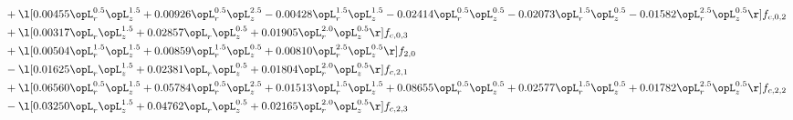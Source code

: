 \begin{alignat}{2}
& + \l[  0.00455 \opL_r^{0.5} \opL_z^{1.5} +  0.00926 \opL_r^{0.5} \opL_z^{2.5}   -0.00428 \opL_r^{1.5} \opL_z^{1.5}   -0.02414 \opL_r^{0.5} \opL_z^{0.5}   -0.02073 \opL_r^{1.5} \opL_z^{0.5}   -0.01582 \opL_r^{2.5} \opL_z^{0.5}  \r] f_{c,0,2} \nonumber \\ 
& + \l[  0.00317 \opL_r \opL_z^{1.5} +  0.02857 \opL_r \opL_z^{0.5} +  0.01905 \opL_r^{2.0} \opL_z^{0.5}  \r] f_{c,0,3} \nonumber \\ 
& + \l[  0.00504 \opL_r^{1.5} \opL_z^{1.5} +  0.00859 \opL_r^{1.5} \opL_z^{0.5} +  0.00810 \opL_r^{2.5} \opL_z^{0.5}  \r] f_{2,0} \nonumber \\ 
& - \l[  0.01625 \opL_r \opL_z^{1.5} +  0.02381 \opL_r \opL_z^{0.5} +  0.01804 \opL_r^{2.0} \opL_z^{0.5}  \r] f_{c,2,1} \nonumber \\ 
& + \l[  0.06560 \opL_r^{0.5} \opL_z^{1.5} +  0.05784 \opL_r^{0.5} \opL_z^{2.5} +  0.01513 \opL_r^{1.5} \opL_z^{1.5} +  0.08655 \opL_r^{0.5} \opL_z^{0.5} +  0.02577 \opL_r^{1.5} \opL_z^{0.5} +  0.01782 \opL_r^{2.5} \opL_z^{0.5}  \r] f_{c,2,2} \nonumber \\ 
& - \l[  0.03250 \opL_r \opL_z^{1.5} +  0.04762 \opL_r \opL_z^{0.5} +  0.02165 \opL_r^{2.0} \opL_z^{0.5}  \r] f_{c,2,3} \nonumber \\ 
\end{alignat} 


